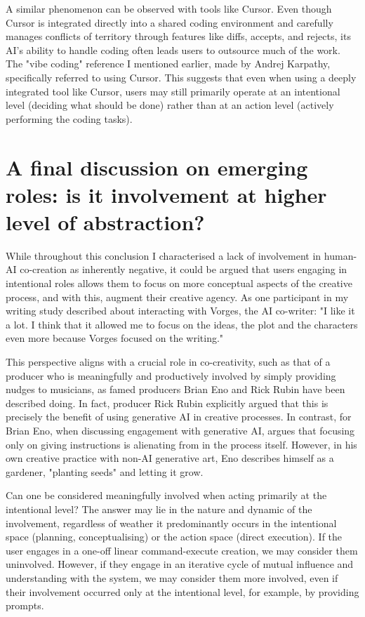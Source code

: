 A similar phenomenon can be observed with tools like Cursor. Even though Cursor is integrated directly into a shared coding environment and carefully manages conflicts of territory through features like diffs, accepts, and rejects, its AI's ability to handle coding often leads users to outsource much of the work. The "vibe coding" reference I mentioned earlier, made by Andrej Karpathy, specifically referred to using Cursor. This suggests that even when using a deeply integrated tool like Cursor, users may still primarily operate at an intentional level (deciding what should be done) rather than at an action level (actively performing the coding tasks).

\section{A final discussion on emerging roles: is it involvement at higher level of abstraction?}

While throughout this conclusion I characterised a lack of involvement in human-AI co-creation as inherently negative, it could be argued that users engaging in intentional roles allows them to focus on more conceptual aspects of the creative process, and with this, augment their creative agency. As one participant in my writing study described about interacting with Vorges, the AI co-writer: "I like it a lot. I think that it allowed me to focus on the ideas, the plot and the characters even more because Vorges focused on the writing."

This perspective aligns with a crucial role in co-creativity, such as that of a producer who is meaningfully and productively involved by simply providing nudges to musicians, as famed producers Brian Eno and Rick Rubin have been described doing. In fact, producer Rick Rubin explicitly argued that this is precisely the benefit of using generative AI in creative processes. In contrast, for Brian Eno, when discussing engagement with generative AI, argues that focusing only on giving instructions is alienating from in the process itself. However, in his own creative practice with non-AI generative art, Eno describes himself as a gardener, "planting seeds" and letting it grow. 

Can one be considered meaningfully involved when acting primarily at the intentional level? The answer may lie in the nature and dynamic of the involvement, regardless of weather it predominantly occurs in the intentional space (planning, conceptualising) or the action space (direct execution). If the user engages in a one-off linear command-execute creation, we may consider them uninvolved. However, if they engage in an iterative cycle of mutual influence and understanding with the system, we may consider them more involved, even if their involvement occurred only at the intentional level, for example, by providing prompts. 

